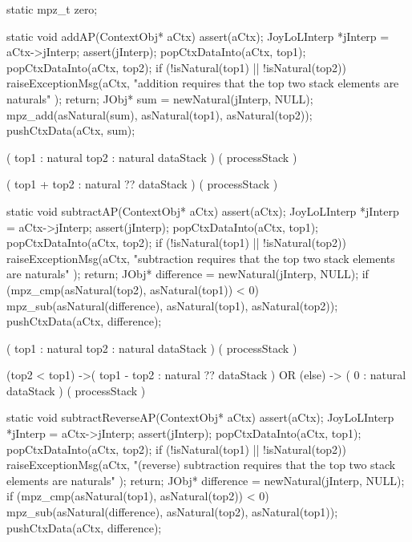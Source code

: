 \startCCode
static  mpz_t zero;
\stopCCode

\startCCode
static void addAP(ContextObj* aCtx) {
  assert(aCtx);
  JoyLoLInterp *jInterp = aCtx->jInterp;
  assert(jInterp);
  popCtxDataInto(aCtx, top1);
  popCtxDataInto(aCtx, top2);
  if (!isNatural(top1) || !isNatural(top2)) {
    raiseExceptionMsg(aCtx,
      "addition requires that the top two stack elements are naturals"
    );
    return;
  }
  JObj* sum = newNatural(jInterp, NULL);
  mpz_add(asNatural(sum), asNatural(top1), asNatural(top2));
  pushCtxData(aCtx, sum);
}
\stopCCode

\startWord[add]

\preDataStack
  (
    top1 : natural
    top2 : natural
    dataStack
  )
\preProcessStack
  ( processStack )
\preConditions
\stopPreStack

\postDataStack
  (
    top1 + top2 : natural ??
    dataStack
  )
\postProcessStack
  ( processStack )
\postConditions
\stopPostStack

\stopWord

\startCCode
static void subtractAP(ContextObj* aCtx) {
  assert(aCtx);
  JoyLoLInterp *jInterp = aCtx->jInterp;
  assert(jInterp);
  popCtxDataInto(aCtx, top1);
  popCtxDataInto(aCtx, top2);
  if (!isNatural(top1) || !isNatural(top2)) {
    raiseExceptionMsg(aCtx,
      "subtraction requires that the top two stack elements are naturals"
    );
    return;
  }
  JObj* difference = newNatural(jInterp, NULL);
  if (mpz_cmp(asNatural(top2), asNatural(top1)) < 0) {
    mpz_sub(asNatural(difference), asNatural(top1), asNatural(top2));
  }
  pushCtxData(aCtx, difference);
}
\stopCCode

\startWord[subtract]

\preDataStack
  (
    top1 : natural
    top2 : natural
    dataStack
  )
\preProcessStack
  ( processStack )
\preConditions
\stopPreStack

\postDataStack
  (top2 < top1) ->(
    top1 - top2 : natural ??
    dataStack
  )
  OR
  (else) -> (
    0 : natural
    dataStack
  )
\postProcessStack
  ( processStack )
\postConditions
\stopPostStack

\stopWord

\startCCode
static void subtractReverseAP(ContextObj* aCtx) {
  assert(aCtx);
  JoyLoLInterp *jInterp = aCtx->jInterp;
  assert(jInterp);
  popCtxDataInto(aCtx, top1);
  popCtxDataInto(aCtx, top2);
  if (!isNatural(top1) || !isNatural(top2)) {
    raiseExceptionMsg(aCtx,
      "(reverse) subtraction requires that the top two stack elements are naturals"
    );
    return;
  }
  JObj* difference = newNatural(jInterp, NULL);
  if (mpz_cmp(asNatural(top1), asNatural(top2)) < 0) {
    mpz_sub(asNatural(difference), asNatural(top2), asNatural(top1));
  }
  pushCtxData(aCtx, difference);
}
\stopCCode

